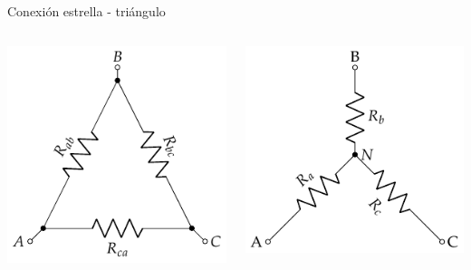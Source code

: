 \documentclass[aspectratio=169, xcolor={usenames,svgnames,dvipsnames}]{beamer}
\begin{document}
\begin{frame}{Conexión estrella - triángulo}
    \begin{columns}
    \begin{column}{0.5\columnwidth}
    \begin{center}
    \includegraphics[width=.9\linewidth]{../figs/Conexion_Triangulo.pdf}
    \end{center}
    \end{column}
    \begin{column}{0.5\columnwidth}
    \begin{center}
    \includegraphics[width=.9\linewidth]{../figs/Conexion_Estrella.pdf}
    \end{center}
    \end{column}
    \end{columns}
\end{frame}
\end{document}
